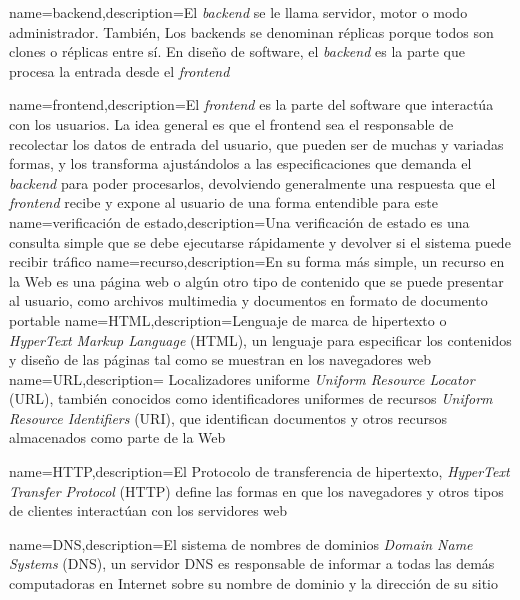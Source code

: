 {name={backend},description={El \textit{backend} se le llama servidor, motor o modo administrador. Tambi\'en, Los backends se denominan r\'eplicas porque todos son clones o r\'eplicas entre s\'i. En dise\~no de software,  el \textit{backend} es la parte que procesa la entrada desde el \textit{frontend}}}

{name={frontend},description={El \textit{frontend}  es la parte del software que interactúa con los usuarios. La idea general es que el frontend sea el responsable de recolectar los datos de entrada del usuario, que pueden ser de muchas y variadas formas, y los transforma ajustándolos a las especificaciones que demanda el \textit{backend} para poder procesarlos, devolviendo generalmente una respuesta que el \textit{frontend} recibe y expone al usuario de una forma entendible para este}}
{name={verificaci\'on de estado},description={Una verificaci\'on de estado es una consulta simple que se debe ejecutarse rápidamente y devolver si el sistema puede recibir tráfico}}
{name={recurso},description={En su forma m\'as simple, un recurso en la Web es una página web o algún otro tipo de contenido que se puede presentar al usuario, como archivos multimedia y documentos en formato de documento portable}}
{name={HTML},description={Lenguaje de marca de hipertexto o \textit{HyperText Markup Language} (HTML), un lenguaje para especificar los contenidos y diseño de las páginas tal como se muestran en los navegadores web}}
{name={URL},description={ Localizadores uniforme \textit{Uniform Resource Locator} (URL), también conocidos como identificadores uniformes de recursos  \textit{Uniform Resource Identifiers} (URI), que identifican documentos y otros recursos almacenados como parte de la Web	}}	

{name={HTTP},description={El Protocolo de transferencia de hipertexto, \textit{HyperText Transfer Protocol}  (HTTP) define las formas en que los navegadores y otros tipos de clientes interactúan con los servidores web}}

{name={DNS},description={El sistema de nombres de dominios \textit{Domain Name Systems} (DNS), un servidor DNS es responsable de informar a todas las dem\'as computadoras en Internet sobre su nombre de dominio y la direcci\'on de su sitio }}

